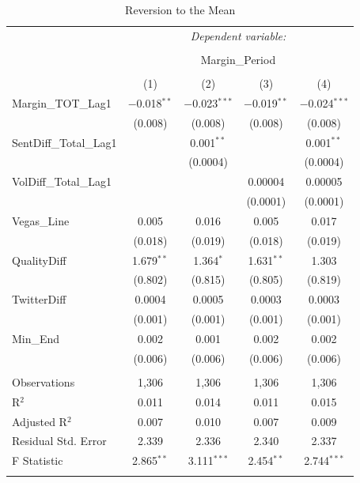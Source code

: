 \documentclass[12pt]{article}
\begin{document}
\begin{doublespacing}
\begin{table}[H] 
\centering 
\caption{Reversion to the Mean} 
\label{table:meanreversion} 
\begin{tabular*}{\textwidth}{@{\extracolsep{\fill}}lcccc} 
\hline 
\hline
 & \multicolumn{4}{c}{\textit{Dependent variable:}} \\ 
\cline{2-5} 
\\[-3.0ex] & \multicolumn{4}{c}{Margin\_Period} \\ 
\\[-1.5ex] & (1) & (2) & (3) & (4)\\ 
\hline
 Margin\_TOT\_Lag1 & $-$0.018$^{**}$ & $-$0.023$^{***}$ & $-$0.019$^{**}$ & $-$0.024$^{***}$ \\ 
  & (0.008) & (0.008) & (0.008) & (0.008) \\ 
 SentDiff\_Total\_Lag1 &  & 0.001$^{**}$ &  & 0.001$^{**}$ \\ 
  &  & (0.0004) &  & (0.0004) \\ 
 VolDiff\_Total\_Lag1 &  &  & 0.00004 & 0.00005 \\ 
  &  &  & (0.0001) & (0.0001) \\ 
 Vegas\_Line & 0.005 & 0.016 & 0.005 & 0.017 \\ 
  & (0.018) & (0.019) & (0.018) & (0.019) \\ 
 QualityDiff & 1.679$^{**}$ & 1.364$^{*}$ & 1.631$^{**}$ & 1.303 \\ 
  & (0.802) & (0.815) & (0.805) & (0.819) \\ 
 TwitterDiff & 0.0004 & 0.0005 & 0.0003 & 0.0003 \\ 
  & (0.001) & (0.001) & (0.001) & (0.001) \\ 
 Min\_End & 0.002 & 0.001 & 0.002 & 0.002 \\ 
  & (0.006) & (0.006) & (0.006) & (0.006) \\ 
\hline \\[-1.8ex] 
Observations & 1,306 & 1,306 & 1,306 & 1,306 \\ 
R$^{2}$ & 0.011 & 0.014 & 0.011 & 0.015 \\ 
Adjusted R$^{2}$ & 0.007 & 0.010 & 0.007 & 0.009 \\ 
Residual Std. Error & 2.339 & 2.336 & 2.340 & 2.337 \\ 
F Statistic & 2.865$^{**}$ & 3.111$^{***}$ & 2.454$^{**}$ & 2.744$^{***}$ \\ 
\hline 
\hline \\[-1.8ex] 
\end{tabular*} 
\end{table} 


\end{doublespacing}
\end{document}
